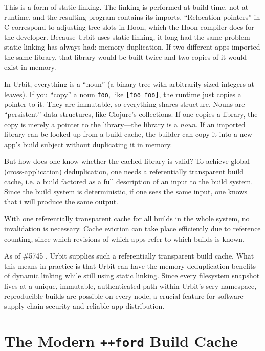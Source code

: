 \documentclass[twoside]{article}
\begin{document}
This is a form of static linking.  The linking is performed at build time, not at runtime, and the resulting program contains its imports.  “Relocation pointers” in C correspond to adjusting tree slots in Hoon, which the Hoon compiler does for the developer.  Because Urbit uses static linking, it long had the same problem static linking has always had:  memory duplication.  If two different apps imported the same library, that library would be built twice and two copies of it would exist in memory.

In Urbit, everything is a “noun” (a binary tree with arbitrarily-sized integers at leaves).  If you “copy” a noun \lstinline[style=inlinecode]{foo}, like \lstinline[style=inlinecode]{[foo foo]}, the runtime just copies a pointer to it.  They are immutable, so everything shares structure.  Nouns are “persistent” data structures, like Clojure's collections.  If one copies a library, the copy is merely a pointer to the library—the library is a \emph{noun}.  If an imported library can be looked up from a build cache, the builder can copy it into a new app's build subject without duplicating it in memory.  

But how does one know whether the cached library is valid?  To achieve global (cross-application) deduplication, one needs a referentially transparent build cache, i.e. a build factored as a full description of an input to the build system.  Since the build system is deterministic, if one sees the same input, one knows that i will produce the same output.

With one referentially transparent cache for all builds in the whole system, no invalidation is necessary.  Cache eviction can take place efficiently due to reference counting, since which revisions of which apps refer to which builds is known.

As of \#5745 \citep{Monk2022}, Urbit supplies such a referentially transparent build cache.  What this means in practice is that Urbit can have the memory deduplication benefits of dynamic linking while still using static linking.  Since every filesystem snapshot lives at a unique, immutable, authenticated path within Urbit's scry namespace, reproducible builds are possible on every node, a crucial feature for software supply chain security and reliable app distribution.

\section{The Modern \lstinline[style=inlinecode]{++ford} Build Cache}
\end{document}
